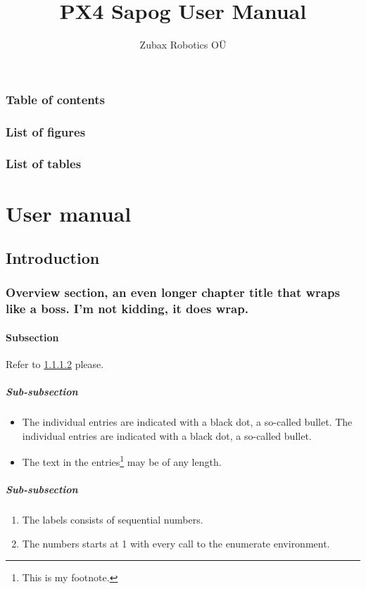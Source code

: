 \documentclass[a4paper,onecolumn,openany]{book}
\author{Zubax Robotics O\"U}
\title{PX4 Sapog User Manual}
\makeatletter
\renewcommand{\contentsname}{Table of contents}
\renewcommand{\listfigurename}{List of figures}
\renewcommand{\listtablename}{List of tables}
\renewcommand\tableofcontents{%
    \thispagestyle{plain}
    \section*{\contentsname}%
    \@starttoc{toc}%
    }
\renewcommand\listoffigures{%
    \thispagestyle{plain}
    \section*{\listfigurename}%
    \@starttoc{lof}%
    }
\renewcommand\listoftables{%
    \thispagestyle{plain}
    \section*{\listtablename}%
    \@starttoc{lot}%
    }
\makeatother
\begin{document}
\frontmatter

\maketitle
\tableofcontents
\listoffigures
\listoftables

\mainmatter

\part{User manual}

\chapter{Introduction}

\section{Overview section, an even longer chapter title that wraps like a boss. I'm not kidding, it does wrap.}

\subsection{Subsection}

Refer to \ref{sec:subsubsection} please.

\lipsum[1]

\subsubsection{Sub-subsection}

\begin{itemize}
  \item The individual entries are indicated with a black dot, a so-called bullet.
The individual entries are indicated with a black dot, a so-called bullet.
  \item The text in the entries\footnote{This is my footnote.} may be of any length.
\end{itemize}

\lipsum[2]

\subsubsection{Sub-subsection}

\label{sec:subsubsection}
\begin{enumerate}
  \item The labels consists of sequential numbers.
  \item The numbers starts at 1 with every call to the enumerate environment.
\end{enumerate}
\end{document}
